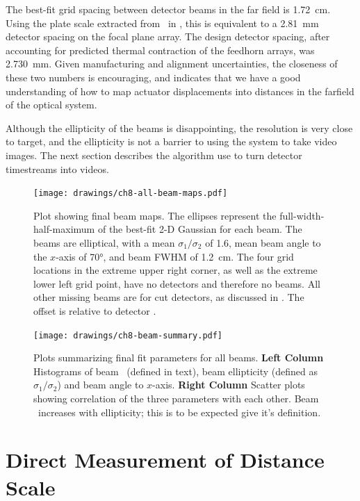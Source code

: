 The best-fit grid spacing between detector beams in the far field is \SI{1.72}{\cm}.
Using the plate scale extracted from \ZEMAX\ in , this is equivalent to a \SI{2.81}{\mm} detector spacing on the focal plane array.
The design detector spacing, after accounting for predicted thermal contraction of the feedhorn arrays, was \SI{2.730}{\mm}.
Given manufacturing and alignment uncertainties, the closeness of these two numbers is encouraging, and indicates that we have a good understanding of how to map actuator displacements into distances in the farfield of the optical system.

Although the ellipticity of the beams is disappointing, the resolution is very close to target, and the ellipticity is not a barrier to using the system to take video images. The next section describes the algorithm use to turn detector timestreams into videos.

\begin{figure}[th]
\centering
\texttt{[image: drawings/ch8-all-beam-maps.pdf]}
\caption{
Plot showing final beam maps.
The ellipses represent the full-width-half-maximum of the best-fit 2-D Gaussian for each beam. The beams are elliptical, with a mean $\sigma_1/\sigma_2$ of 1.6, mean beam angle to the $x$-axis of \ang{70}, and beam FWHM of \SI{1.2}{\cm}.
The four grid locations in the extreme upper right corner, as well as the extreme lower left grid point, have no detectors and therefore no beams. All other missing beams are for cut detectors, as discussed in .
The offset is relative to detector .
}
\label{fig:ch8-all-beam-maps}
\end{figure}

\begin{figure}[th]
\centering
\texttt{[image: drawings/ch8-beam-summary.pdf]}
\caption{
  Plots summarizing final fit parameters for all beams.
  \textbf{Left Column} Histograms of beam \FWHM\ (defined in text), beam ellipticity (defined as $\sigma_1 / \sigma_2$) and beam angle to $x$-axis.
  \textbf{Right Column} Scatter plots showing correlation of the three parameters with each other. Beam \FWHM\ increases with ellipticity; this is to be expected give it's definition.
}
\label{fig:ch8-beam-summary}
\end{figure}

\section{Direct Measurement of Distance Scale} \label{sec:ch8-dist-scale}

